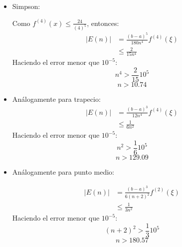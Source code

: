 \begin{frame}
    \begin{solution}
        \begin{itemize}
            \item

                  Simpson:

                  Como $f^{(4)}(x)\leq\frac{24}{(4)^5}$, entonces:
                  \begin{align*}
                      |E(n)| & =\frac{(b-a)^5}{180n^4}f^{(4)}(\xi) \\
                             & \leq \frac{2}{15n^4}
                  \end{align*}
                  Haciendo el error menor que $10^{-5}$:
                  $$n^4>\frac{2}{15}10^5$$
                  $$n>10.74$$

            \item

                  Análogamente para trapecio:
                  \begin{align*}
                      |E(n)| & =\frac{(b-a)^3}{12n^4}f^{(4)}(\xi) \\
                             & \leq \frac{1}{6n^2}
                  \end{align*}
                  Haciendo el error menor que $10^{-5}$:
                  $$n^2>\frac{1}{6}10^5$$
                  $$n>129.09$$
        \end{itemize}
    \end{solution}
\end{frame}

\begin{frame}
    \begin{solution}
        \begin{itemize}
            \item
                  Análogamente para punto medio:

                  \begin{align*}
                      |E(n)| & =\frac{(b-a)^3}{6(n+2)^2}f^{(2)}(\xi) \\
                             & \leq \frac{1}{3n^2}
                  \end{align*}
                  Haciendo el error menor que $10^{-5}$:
                  $$(n+2)^2>\frac{1}{3}10^5$$
                  $$n>180.57$$
        \end{itemize}
    \end{solution}
\end{frame}
